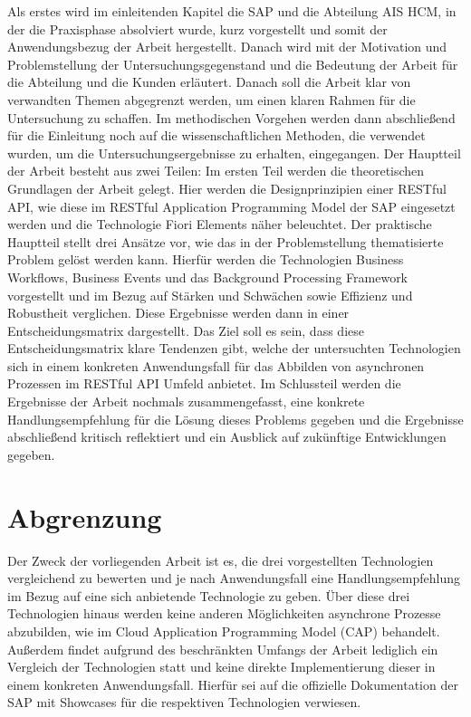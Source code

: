 Als erstes wird im einleitenden Kapitel die SAP und die Abteilung AIS HCM, in der die Praxisphase absolviert wurde, kurz vorgestellt und somit der Anwendungsbezug der Arbeit hergestellt. Danach wird mit der Motivation und Problemstellung der Untersuchungsgegenstand und die Bedeutung der Arbeit für die Abteilung und die Kunden erläutert. Danach soll die Arbeit klar von verwandten Themen abgegrenzt werden, um einen klaren Rahmen für die Untersuchung zu schaffen. Im methodischen Vorgehen werden dann abschlie{\ss}end für die Einleitung noch auf die wissenschaftlichen Methoden, die verwendet wurden, um die Untersuchungsergebnisse zu erhalten, eingegangen. Der Hauptteil der Arbeit besteht aus zwei Teilen: Im ersten Teil werden die theoretischen Grundlagen der Arbeit gelegt. Hier werden die Designprinzipien einer RESTful API, wie diese im RESTful Application Programming Model der SAP eingesetzt werden und die Technologie Fiori Elements näher beleuchtet. Der praktische Hauptteil stellt drei Ansätze vor, wie das in der Problemstellung thematisierte Problem gelöst werden kann. Hierfür werden die Technologien Business Workflows, Business Events und das Background Processing Framework vorgestellt und im Bezug auf Stärken und Schwächen sowie Effizienz und Robustheit verglichen. Diese Ergebnisse werden dann in einer Entscheidungsmatrix dargestellt. Das Ziel soll es sein, dass diese Entscheidungsmatrix klare Tendenzen gibt, welche der untersuchten Technologien sich in einem konkreten Anwendungsfall für das Abbilden von asynchronen Prozessen im RESTful API Umfeld anbietet. Im Schlussteil werden die Ergebnisse der Arbeit nochmals zusammengefasst, eine konkrete Handlungsempfehlung für die Lösung dieses Problems gegeben und die Ergebnisse abschlie{\ss}end kritisch reflektiert und ein Ausblick auf zukünftige Entwicklungen gegeben.

\section{Abgrenzung}

Der Zweck der vorliegenden Arbeit ist es, die drei vorgestellten Technologien vergleichend zu bewerten und je nach Anwendungsfall eine Handlungsempfehlung im Bezug auf eine sich anbietende Technologie zu geben. Über diese drei Technologien hinaus werden keine anderen Möglichkeiten asynchrone Prozesse abzubilden, wie \zB im Cloud Application Programming Model (CAP) behandelt. Au{\ss}erdem findet aufgrund des beschränkten Umfangs der Arbeit lediglich ein Vergleich der Technologien statt und keine direkte Implementierung dieser in einem konkreten Anwendungsfall. Hierfür sei auf die offizielle Dokumentation der SAP mit Showcases für die respektiven Technologien verwiesen.

